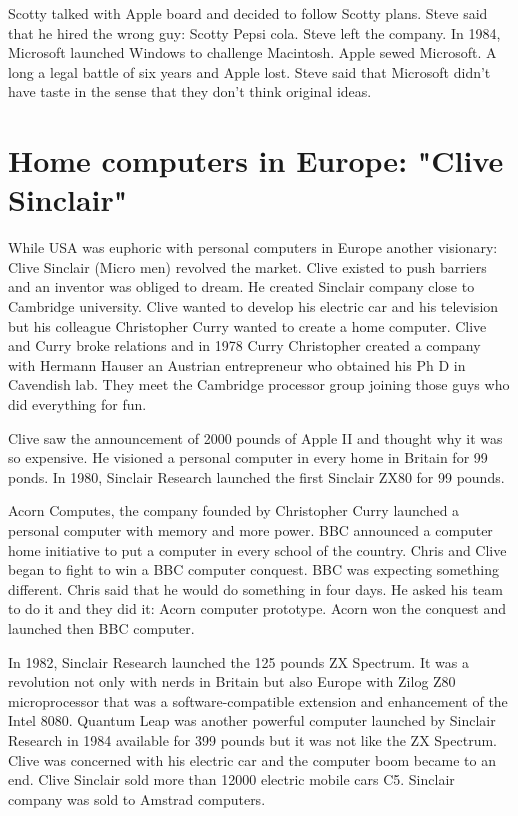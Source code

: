 Scotty talked with Apple board and decided to follow Scotty plans. 
 Steve said that he hired the wrong guy: Scotty Pepsi cola.  Steve left the company.   
 In 1984, Microsoft launched Windows to challenge Macintosh.    
 Apple sewed Microsoft. A long a legal battle of six years and  Apple lost. 
 Steve said that Microsoft didn't have taste 
 in the sense that they don't think original ideas. 
   
   
   
   
    
\section*{Home computers in Europe: "Clive Sinclair"} 
 While USA was euphoric with personal computers in Europe another visionary: 
 Clive Sinclair (Micro men) revolved the market.    
 Clive existed to push barriers and an inventor was obliged to dream. 
 He created Sinclair company close to Cambridge university. 
 Clive wanted to develop his electric car and his television but his colleague 
 Christopher Curry wanted to create a home computer.   
 Clive and Curry broke relations and in 1978 Curry Christopher created
 a company with Hermann Hauser an Austrian entrepreneur  who obtained his Ph D in Cavendish
 lab. They meet the Cambridge processor group joining those guys who did everything for fun. 
    
    
 Clive saw the announcement of 2000 pounds of Apple II and thought why it was so expensive. 
 He visioned a personal computer in every home in Britain for 99 ponds.
 In 1980, Sinclair Research launched the first Sinclair ZX80 for 99 pounds.  
  
    
 Acorn Computes, the company founded by Christopher Curry launched a personal computer 
 with memory and more power.   
 BBC announced a computer home initiative to put a computer in every school of the country.    
 Chris and Clive began to fight to win a  BBC computer conquest. 
 BBC was expecting something different. Chris said that he would do something in four days. 
 He asked his team to do it and they did it:  Acorn computer prototype. 
 Acorn won the conquest and launched then BBC computer. 
 
 In 1982, Sinclair Research launched the 125 pounds ZX Spectrum. 
 It was a revolution not only with nerds in Britain but also Europe with Zilog Z80 microprocessor that was a 
 software-compatible extension and enhancement of the Intel 8080. 
 Quantum Leap was another powerful computer launched by Sinclair Research  in 
 1984 available for 399 pounds but it was not like the ZX Spectrum. 
 Clive was concerned with his electric car and the computer boom became to an end. 
 Clive Sinclair sold more than 12000 electric mobile cars C5.  
 Sinclair company was sold to Amstrad computers. 
 
